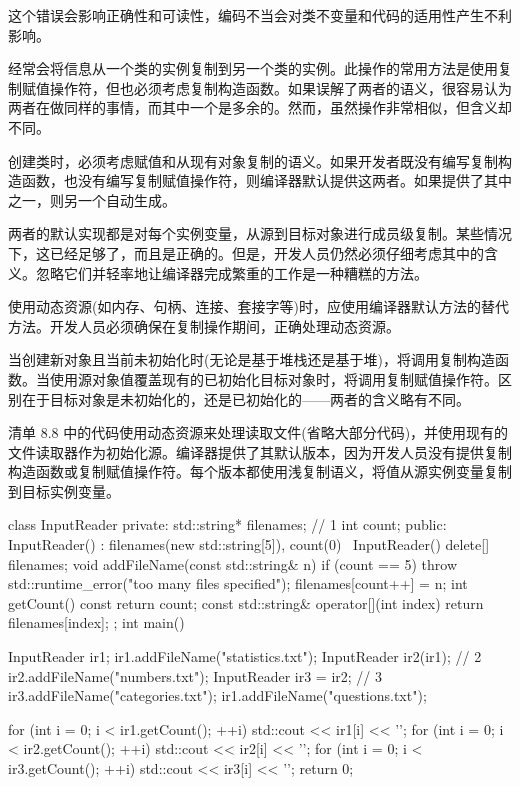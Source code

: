 这个错误会影响正确性和可读性，编码不当会对类不变量和代码的适用性产生不利影响。

经常会将信息从一个类的实例复制到另一个类的实例。此操作的常用方法是使用复制赋值操作符，但也必须考虑复制构造函数。如果误解了两者的语义，很容易认为两者在做同样的事情，而其中一个是多余的。然而，虽然操作非常相似，但含义却不同。


创建类时，必须考虑赋值和从现有对象复制的语义。如果开发者既没有编写复制构造函数，也没有编写复制赋值操作符，则编译器默认提供这两者。如果提供了其中之一，则另一个自动生成。

两者的默认实现都是对每个实例变量，从源到目标对象进行成员级复制。某些情况下，这已经足够了，而且是正确的。但是，开发人员仍然必须仔细考虑其中的含义。忽略它们并轻率地让编译器完成繁重的工作是一种糟糕的方法。

使用动态资源(如内存、句柄、连接、套接字等)时，应使用编译器默认方法的替代方法。开发人员必须确保在复制操作期间，正确处理动态资源。

当创建新对象且当前未初始化时(无论是基于堆栈还是基于堆)，将调用复制构造函数。当使用源对象值覆盖现有的已初始化目标对象时，将调用复制赋值操作符。区别在于目标对象是未初始化的，还是已初始化的——两者的含义略有不同。

清单 8.8 中的代码使用动态资源来处理读取文件(省略大部分代码)，并使用现有的文件读取器作为初始化源。编译器提供了其默认版本，因为开发人员没有提供复制构造函数或复制赋值操作符。每个版本都使用浅复制语义，将值从源实例变量复制到目标实例变量。


\begin{cpp}
class InputReader {
private:
  std::string* filenames; // 1
  int count;
public:
  InputReader() : filenames(new std::string[5]), count(0) {}
  ~InputReader() { delete[] filenames; }
  void addFileName(const std::string& n) {
    if (count == 5)
      throw std::runtime_error("too many files specified");
    filenames[count++] = n;
  }
  int getCount() const { return count; }
  const std::string& operator[](int index) {
    return filenames[index];
  }
};
int main() {
  InputReader ir1;
  ir1.addFileName("statistics.txt");
  InputReader ir2(ir1); // 2
  ir2.addFileName("numbers.txt");
  InputReader ir3 = ir2; // 3
  ir3.addFileName("categories.txt");
  ir1.addFileName("questions.txt");

  for (int i = 0; i < ir1.getCount(); ++i)
    std::cout << ir1[i] << '\n';
  for (int i = 0; i < ir2.getCount(); ++i)
    std::cout << ir2[i] << '\n';
  for (int i = 0; i < ir3.getCount(); ++i)
    std::cout << ir3[i] << '\n';
  return 0;
}
\end{cpp}

